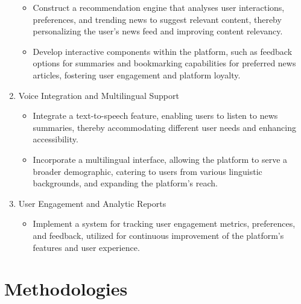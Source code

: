 \documentclass[a4paper]{article}
\begin{document}
\begin{enumerate}
\begin{itemize}
            \item Construct a recommendation engine that analyses user interactions, preferences, and trending news to suggest relevant content, thereby personalizing the user's news feed and improving content relevancy.
            \item Develop interactive components within the platform, such as feedback options for summaries and bookmarking capabilities for preferred news articles, fostering user engagement and platform loyalty.
        \end{itemize}
    \item Voice Integration and Multilingual Support
        \begin{itemize}
            \item Integrate a text-to-speech feature, enabling users to listen to news summaries, thereby accommodating different user needs and enhancing accessibility.
            \item Incorporate a multilingual interface, allowing the platform to serve a broader demographic, catering to users from various linguistic backgrounds, and expanding the platform's reach.
        \end{itemize}
    \item User Engagement and Analytic Reports
        \begin{itemize}
            \item Implement a system for tracking user engagement metrics, preferences, and feedback, utilized for continuous improvement of the platform's features and user experience.
        \end{itemize}
\end{enumerate}

\section{Methodologies}
\end{document}
